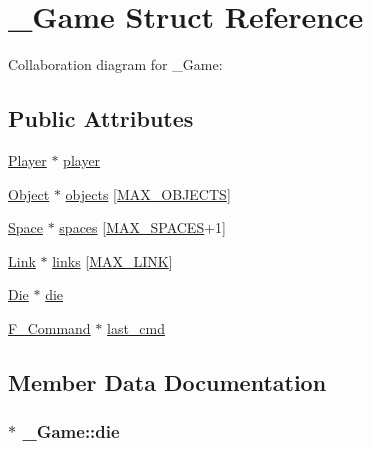\hypertarget{struct__Game}{}\section{\+\_\+\+Game Struct Reference}
\label{struct__Game}


Collaboration diagram for \+\_\+\+Game\+:
\subsection*{Public Attributes}
\begin{DoxyCompactItemize}
\item 
\hyperlink{player_8h_af30e2030635a69690f85e48bc6ef202f}{Player} $\ast$ \hyperlink{struct__Game_a31406605782d71ec00c4bf258ea76267}{player}
\item 
\hyperlink{object_8h_a7f8bbcda919b65ce67f92fba08e0212f}{Object} $\ast$ \hyperlink{struct__Game_ad45bf5645a26e546d0060a2e61f9cf81}{objects} \mbox{[}\hyperlink{game_8h_acdc7844fbd4d45737d4aa56834d37829}{M\+A\+X\+\_\+\+O\+B\+J\+E\+C\+TS}\mbox{]}
\item 
\hyperlink{space_8h_a67533ffc2b70463baecc38fb0629bbfc}{Space} $\ast$ \hyperlink{struct__Game_ab4180417d9148f8abb2233ca6c4ecfe5}{spaces} \mbox{[}\hyperlink{space_8h_a5f54fd55f983a2e33ce076cd9f587e82}{M\+A\+X\+\_\+\+S\+P\+A\+C\+ES}+1\mbox{]}
\item 
\hyperlink{link_8h_ae3b299941e67be6971bfd64a25505eff}{Link} $\ast$ \hyperlink{struct__Game_aa4ff88aaf2a54616e5863609effad94e}{links} \mbox{[}\hyperlink{link_8h_abfa744c8ca5b46f7f2a10aea53a4ec59}{M\+A\+X\+\_\+\+L\+I\+NK}\mbox{]}
\item 
\hyperlink{die_8h_a892f0b0bf81d69a1f7a14ea238e36dd3}{Die} $\ast$ \hyperlink{struct__Game_a0d6009b5dcb080489c192a9198fa7d46}{die}
\item 
\hyperlink{command_8h_a76085817cb558dc3640088040ba47898}{F\+\_\+\+Command} $\ast$ \hyperlink{struct__Game_a6dd34045346b3ea8dd1a4e3f08ab71c5}{last\+\_\+cmd}
\end{DoxyCompactItemize}


\subsection{Member Data Documentation}
\subsubsection[{\texorpdfstring{die}{die}}]{$\ast$ \+\_\+\+Game\+::die}\hypertarget{struct__Game_a0d6009b5dcb080489c192a9198fa7d46}{}\label{struct__Game_a0d6009b5dcb080489c192a9198fa7d46}
